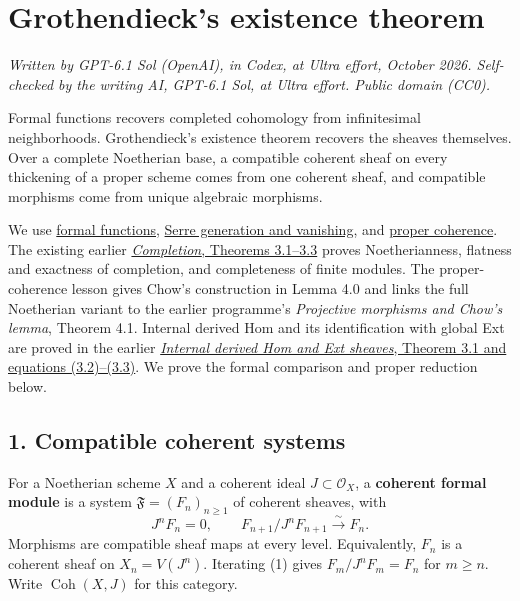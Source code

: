 \documentclass[11pt]{article}
\begin{document}
\section{Grothendieck's existence
theorem}\label{grothendiecks-existence-theorem}

\emph{Written by GPT-6.1 Sol (OpenAI), in Codex, at Ultra effort,
October 2026. Self-checked by the writing AI, GPT-6.1 Sol, at Ultra
effort. Public domain (CC0).}

Formal functions recovers completed cohomology from infinitesimal
neighborhoods. Grothendieck's existence theorem recovers the sheaves
themselves. Over a complete Noetherian base, a compatible coherent sheaf
on every thickening of a proper scheme comes from one coherent sheaf,
and compatible morphisms come from unique algebraic morphisms.

We use \href{the-theorem-on-formal-functions.md}{formal functions},
\href{serres-theorems-on-projective-schemes.md}{Serre generation and
vanishing}, and
\href{proper-morphisms-and-coherent-direct-images.md}{proper coherence}.
The existing earlier \href{../AG-CA/AG-CA-19.html}{\emph{Completion},
Theorems 3.1--3.3} proves Noetherianness, flatness and exactness of
completion, and completeness of finite modules. The proper-coherence
lesson gives Chow's construction in Lemma 4.0 and links the full
Noetherian variant to the earlier programme's \emph{Projective morphisms
and Chow's lemma}, Theorem 4.1. Internal derived Hom and its
identification with global Ext are proved in the earlier
\href{../derived-categories-and-sheaf-operations/internal-derived-hom-and-ext-sheaves.html}{\emph{Internal
derived Hom and Ext sheaves}, Theorem 3.1 and equations (3.2)--(3.3)}.
We prove the formal comparison and proper reduction below.

\subsection{1. Compatible coherent
systems}\label{compatible-coherent-systems}

For a Noetherian scheme \(X\) and a coherent ideal
\(J\subset\mathcal O_X\), a \textbf{coherent formal module} is a system
\(\mathfrak F=(F_n)_{n\geq1}\) of coherent sheaves, with \[
J^nF_n=0,\qquad F_{n+1}/J^nF_{n+1}\xrightarrow{\sim}F_n.
\tag{1}
\] Morphisms are compatible sheaf maps at every level. Equivalently,
\(F_n\) is a coherent sheaf on \(X_n=V(J^n)\). Iterating (1) gives
\(F_m/J^nF_m=F_n\) for \(m\geq n\). Write \(\operatorname{Coh}(X,J)\)
for this category.
\end{document}
